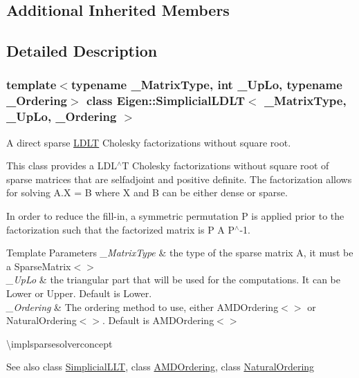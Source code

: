 \subsection*{Additional Inherited Members}


\subsection{Detailed Description}
\subsubsection*{template$<$typename \+\_\+\+Matrix\+Type, int \+\_\+\+Up\+Lo, typename \+\_\+\+Ordering$>$\newline
class Eigen\+::\+Simplicial\+L\+D\+L\+T$<$ \+\_\+\+Matrix\+Type, \+\_\+\+Up\+Lo, \+\_\+\+Ordering $>$}

A direct sparse \mbox{\hyperlink{class_eigen_1_1_l_d_l_t}{L\+D\+LT}} Cholesky factorizations without square root. 

This class provides a L\+D\+L$^\wedge$T Cholesky factorizations without square root of sparse matrices that are selfadjoint and positive definite. The factorization allows for solving A.\+X = B where X and B can be either dense or sparse.

In order to reduce the fill-\/in, a symmetric permutation P is applied prior to the factorization such that the factorized matrix is P A P$^\wedge$-\/1.


\begin{DoxyTemplParams}{Template Parameters}
{\em \+\_\+\+Matrix\+Type} & the type of the sparse matrix A, it must be a Sparse\+Matrix$<$$>$ \\
\hline
{\em \+\_\+\+Up\+Lo} & the triangular part that will be used for the computations. It can be Lower or Upper. Default is Lower. \\
\hline
{\em \+\_\+\+Ordering} & The ordering method to use, either A\+M\+D\+Ordering$<$$>$ or Natural\+Ordering$<$$>$. Default is A\+M\+D\+Ordering$<$$>$\\
\hline
\end{DoxyTemplParams}
\textbackslash{}implsparsesolverconcept

\begin{DoxySeeAlso}{See also}
class \mbox{\hyperlink{class_eigen_1_1_simplicial_l_l_t}{Simplicial\+L\+LT}}, class \mbox{\hyperlink{class_eigen_1_1_a_m_d_ordering}{A\+M\+D\+Ordering}}, class \mbox{\hyperlink{class_eigen_1_1_natural_ordering}{Natural\+Ordering}} 
\end{DoxySeeAlso}


